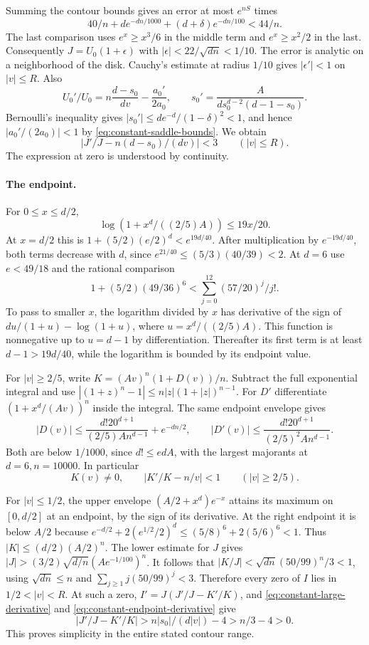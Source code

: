Summing the contour bounds gives an error at most \(e^{nS}\)
times
\[
 40/n+d e^{-dn/1000}+(d+\delta)e^{-dn/100}<44/n .
\]
The last comparison uses \(e^x\ge x^3/6\) in the middle
term and \(e^x\ge x^2/2\) in the last.
Consequently \(J=U_0(1+\epsilon)\) with
\(|\epsilon|<22/\sqrt{dn}<1/10\).
The error is analytic on a neighborhood of the disk.
Cauchy's estimate at radius \(1/10\) gives
\(|\epsilon'|<1\) on \(|v|\le R\). Also
\[
 U_0'/U_0=n\frac{d-s_0}{dv}-\frac{a_0'}{2a_0},\qquad
 s_0'=\frac{A}{d s_0^{d-2}(d-1-s_0)} .
\]
Bernoulli's inequality gives \(|s_0'|\le de^{-d}/(1-\delta)^2<1\),
and hence \(|a_0'/(2a_0)|<1\) by \eqref{eq:constant-saddle-bounds}. We obtain
\begin{equation}
 \left|J'/J-n(d-s_0)/(dv)\right|<3 \qquad (|v|\le R).
 \label{eq:constant-large-derivative}
\end{equation}
The expression at zero is understood by continuity.

\paragraph{The endpoint.}
For \(0\le x\le d/2\),
\[
 \log(1+x^d/((2/5)A))\le19x/20.
\]
At \(x=d/2\) this is \(1+(5/2)(e/2)^d<e^{19d/40}\).
After multiplication by \(e^{-19d/40}\), both terms
decrease with \(d\), since \(e^{21/40}\le(5/3)(40/39)<2\).
At \(d=6\) use \(e<49/18\) and the rational comparison
\[
 1+(5/2)(49/36)^6<\sum_{j=0}^{12}(57/20)^j/j! .
\]
To pass to smaller \(x\), the logarithm divided by \(x\)
has derivative of the sign of \(du/(1+u)-\log(1+u)\),
where \(u=x^d/((2/5)A)\). This function is nonnegative up
to \(u=d-1\) by differentiation. Thereafter its first term
is at least \(d-1>19d/40\), while the logarithm is bounded
by its endpoint value.

For \(|v|\ge2/5\), write \(K=(Av)^n(1+D(v))/n\).
Subtract the full exponential integral and use
\(|(1+z)^n-1|\le n|z|(1+|z|)^{n-1}\).
For \(D'\) differentiate \((1+x^d/(Av))^n\) inside
the integral. The same endpoint envelope gives
\[
 |D(v)|\le \frac{d!20^{d+1}}{(2/5)A n^{d-1}}+e^{-dn/2},\qquad
 |D'(v)|\le \frac{d!20^{d+1}}{(2/5)^2 A n^{d-1}}.
\]
Both are below \(1/1000\), since \(d!\le ed A\), with the
largest majorants at \(d=6,n=10000\). In particular
\begin{equation}
 K(v)\ne0,\qquad |K'/K-n/v|<1\qquad(|v|\ge2/5).
 \label{eq:constant-endpoint-derivative}
\end{equation}

For \(|v|\le1/2\), the upper envelope
\((A/2+x^d)e^{-x}\) attains its maximum on \([0,d/2]\)
at an endpoint, by the sign of its derivative.
At the right endpoint it is below \(A/2\) because
\(e^{-d/2}+2(e^{1/2}/2)^d\le(5/8)^6+2(5/6)^6<1\).
Thus \(|K|\le(d/2)(A/2)^n\).
The lower estimate for \(J\) gives
\(|J|>(3/2)\sqrt{d/n}(A e^{-1/100})^n\).
It follows that \(|K/J|<\sqrt{dn}(50/99)^n/3<1\),
using \(\sqrt{dn}\le n\) and \(\sum_{j\ge1}j(50/99)^j<3\).
Therefore every zero of \(I\) lies in \(1/2<|v|<R\).
At such a zero, \(I'=J(J'/J-K'/K)\), and
\eqref{eq:constant-large-derivative} and
\eqref{eq:constant-endpoint-derivative} give
\[
 |J'/J-K'/K|>n|s_0|/(d|v|)-4>n/3-4>0 .
\]
This proves simplicity in the entire stated contour range.

